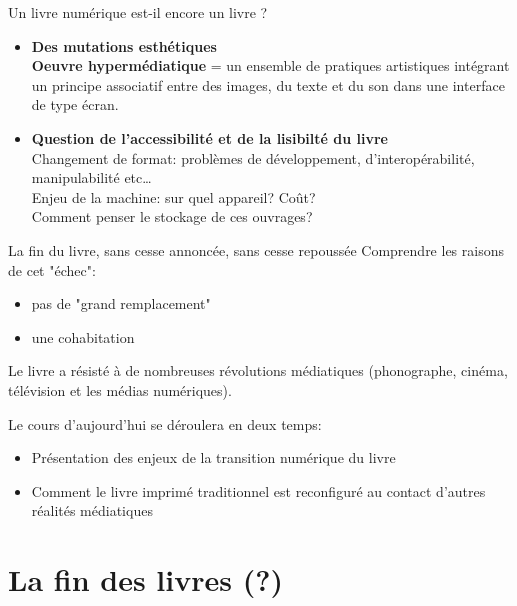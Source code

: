 \documentclass[svgnames,smaller,10pt]{beamer}
\begin{document}
\begin{frame}{Un livre numérique est-il encore un livre ?}
    \begin{itemize}
        \item  \textbf{Des mutations esthétiques}\\
        \vspace{1em}
        \textbf{Oeuvre hypermédiatique} = un ensemble de pratiques artistiques intégrant un principe associatif entre des images, du texte et du son dans une interface de type écran.
        \vspace{1em}
        \item \textbf{Question de l'accessibilité et de la lisibilté du livre} \\
        \vspace{1em}
        \textrightarrow{} Changement de format: problèmes de développement, d'interopérabilité, manipulabilité etc\dots\\
        \textrightarrow{} Enjeu de la machine: sur quel appareil? Coût?\\
        \textrightarrow{} Comment penser le stockage de ces ouvrages?
    \end{itemize}

    
\end{frame}

\begin{frame}{La fin du livre, sans cesse annoncée, sans cesse repoussée}
    Comprendre les raisons de cet "échec":
\begin{itemize}
    \item pas de "grand remplacement"
    \item une cohabitation
\end{itemize}

\textrightarrow{} Le livre a résisté à de nombreuses révolutions médiatiques (phonographe, cinéma, télévision et les médias numériques).

Le cours d'aujourd'hui se déroulera en deux temps:
\begin{itemize}
    \item Présentation des enjeux de la transition numérique du livre
    \item Comment le livre imprimé traditionnel est reconfiguré au contact d'autres réalités médiatiques
\end{itemize}

\end{frame}


\section{La fin des livres (?)}

\end{document}
